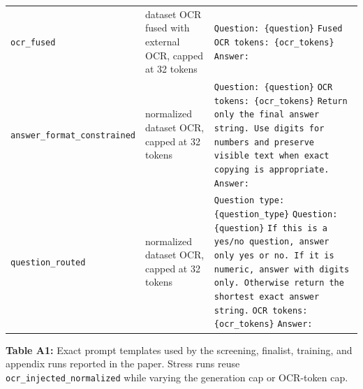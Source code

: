 \begin{center}
\begin{tabular}{>{\raggedright\arraybackslash}p{}>{\raggedright\arraybackslash}p{}>{\raggedright\arraybackslash}p{}}
        \texttt{ocr\_fused} & dataset OCR fused with external OCR, capped at 32 tokens & \texttt{Question: \{question\}} \newline \texttt{Fused OCR tokens: \{ocr\_tokens\}} \newline \texttt{Answer:} \\
        \texttt{answer\_format\_}\newline\texttt{constrained} & normalized dataset OCR, capped at 32 tokens & \texttt{Question: \{question\}} \newline \texttt{OCR tokens: \{ocr\_tokens\}} \newline \texttt{Return only the final answer string. Use digits for numbers and preserve visible text when exact copying is appropriate.} \newline \texttt{Answer:} \\
        \texttt{question\_routed} & normalized dataset OCR, capped at 32 tokens & \texttt{Question type: \{question\_type\}} \newline \texttt{Question: \{question\}} \newline \texttt{If this is a yes/no question, answer only yes or no. If it is numeric, answer with digits only. Otherwise return the shortest exact answer string.} \newline \texttt{OCR tokens: \{ocr\_tokens\}} \newline \texttt{Answer:} \\
        \bottomrule
    \end{tabular}
    \par\smallskip
    \raggedright
    \textbf{Table A1:} Exact prompt templates used by the screening, finalist, training, and appendix runs reported in the paper. Stress runs reuse \texttt{ocr\_injected\_normalized} while varying the generation cap or OCR-token cap.
\end{center}

